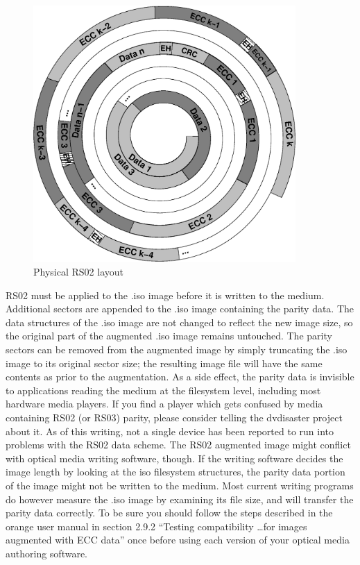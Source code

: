\begin{figure}
 \begin{center}
 \includegraphics[width=10cm]{spiral-rs02.eps}
 \caption{Physical RS02 layout}
 \label{layout-phy-two}
 \end{center}
\end{figure}

RS02 must be applied to the .iso image before it is written to
the medium. Additional sectors are appended to the .iso image 
containing the parity data. The data structures of the .iso image
are not changed to reflect the new image size, so the original
part of the augmented .iso image remains untouched. The parity
sectors can be removed from the augmented image by simply 
truncating the .iso image to its original sector size; the resulting
image file will have the same contents as prior to the augmentation.
As a side effect, the parity data is invisible to applications reading
the medium at the filesystem level, including most hardware media
players. If you find a player which gets confused by media containing
RS02 (or RS03) parity, please consider telling the dvdisaster project about it. As of this writing,
not a single device has been reported to run into problems with
the RS02 data scheme. The RS02 augmented image might conflict with
optical media writing software, though. If the writing software
decides the image length by looking at the iso filesystem structures,
the parity data portion of the image might not be written to the medium.
Most current writing programs do however measure the .iso image by examining
its file size, and will transfer the parity data correctly. To be sure you
should follow the steps described in the orange user manual in section 2.9.2 ``Testing compatibility \dots for images augmented with ECC data'' once
before using each version of your optical media authoring software.


